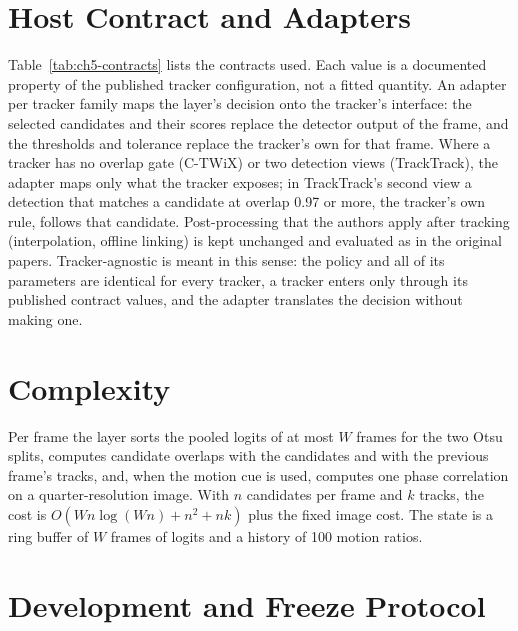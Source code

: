 \section{Host Contract and Adapters}\label{sec:ch5-contract}
Table~\ref{tab:ch5-contracts} lists the contracts used. Each value is a documented property of the published tracker configuration, not a fitted quantity. An adapter per tracker family maps the layer's decision onto the tracker's interface: the selected candidates and their scores replace the detector output of the frame, and the thresholds and tolerance replace the tracker's own for that frame. Where a tracker has no overlap gate (C-TWiX) or two detection views (TrackTrack), the adapter maps only what the tracker exposes; in TrackTrack's second view a detection that matches a candidate at overlap 0.97 or more, the tracker's own rule, follows that candidate. Post-processing that the authors apply after tracking (interpolation, offline linking) is kept unchanged and evaluated as in the original papers. Tracker-agnostic is meant in this sense: the policy and all of its parameters are identical for every tracker, a tracker enters only through its published contract values, and the adapter translates the decision without making one.



\section{Complexity}\label{sec:ch5-complexity}
Per frame the layer sorts the pooled logits of at most $W$ frames for the two Otsu splits, computes candidate overlaps with the candidates and with the previous frame's tracks, and, when the motion cue is used, computes one phase correlation on a quarter-resolution image. With $n$ candidates per frame and $k$ tracks, the cost is $O(Wn\log(Wn) + n^2 + nk)$ plus the fixed image cost. The state is a ring buffer of $W$ frames of logits and a history of 100 motion ratios.

\section{Development and Freeze Protocol}\label{sec:ch5-protocol}

